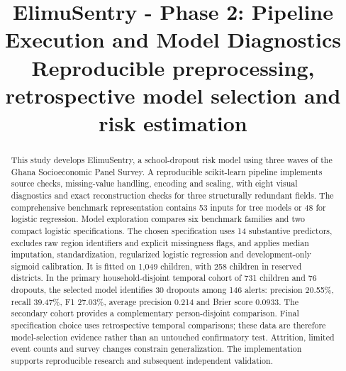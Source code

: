 \documentclass[conference,a4paper]{IEEEtran}
\begin{document}
\title{\bfseries ElimuSentry - Phase 2: Pipeline Execution and Model Diagnostics\\
\large\bfseries Reproducible preprocessing, retrospective model selection and risk estimation}

\author{
}

\maketitle

\begin{abstract}
This study develops ElimuSentry, a school-dropout risk model using three waves of the Ghana Socioeconomic Panel Survey. A reproducible scikit-learn pipeline implements source checks, missing-value handling, encoding and scaling, with eight visual diagnostics and exact reconstruction checks for three structurally redundant fields. The comprehensive benchmark representation contains 53 inputs for tree models or 48 for logistic regression. Model exploration compares six benchmark families and two compact logistic specifications. The chosen specification uses 14 substantive predictors, excludes raw region identifiers and explicit missingness flags, and applies median imputation, standardization, regularized logistic regression and development-only sigmoid calibration. It is fitted on 1,049 children, with 258 children in reserved districts. In the primary household-disjoint temporal cohort of 731 children and 76 dropouts, the selected model identifies 30 dropouts among 146 alerts: precision 20.55\%, recall 39.47\%, F1 27.03\%, average precision 0.214 and Brier score 0.0933. The secondary cohort provides a complementary person-disjoint comparison. Final specification choice uses retrospective temporal comparisons; these data are therefore model-selection evidence rather than an untouched confirmatory test. Attrition, limited event counts and survey changes constrain generalization. The implementation supports reproducible research and subsequent independent validation.
\end{abstract}
\end{document}
